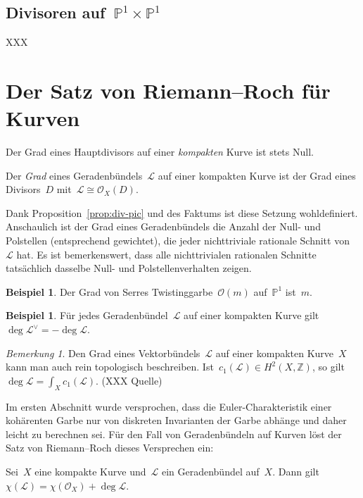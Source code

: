 \documentclass[a4paper,ngerman,12pt]{scrartcl}
\theoremstyle{definition}
\newtheorem{ex}[defn]{Beispiel}
\theoremstyle{plain}
\theoremstyle{remark}
\newtheorem{rem}[defn]{Bemerkung}
\newcommand{\ZZ}{\mathbb{Z}}
\newcommand{\PP}{\mathbb{P}}
\renewcommand{\L}{\mathcal{L}}
\renewcommand{\O}{\mathcal{O}}
\begin{document}
\subsection*{Divisoren auf~$\PP^1 \times \PP^1$}

XXX


\section{Der Satz von Riemann--Roch für Kurven}

\begin{fact}Der Grad eines Hauptdivisors auf einer \emph{kompakten} Kurve ist
stets Null.\end{fact}

\begin{defn}Der \emph{Grad} eines Geradenbündels~$\L$ auf einer kompakten Kurve
ist der Grad eines Divisors~$D$ mit~$\L \cong \O_X(D)$.\end{defn}

Dank Proposition~\ref{prop:div-pic} und des Faktums ist diese Setzung
wohldefiniert. Anschaulich ist der Grad eines Geradenbündels die Anzahl der
Null- und Polstellen (entsprechend gewichtet), die jeder nichttriviale rationale
Schnitt von~$\L$ hat. Es ist bemerkenswert, dass alle nichttrivialen rationalen
Schnitte tatsächlich dasselbe Null- und Polstellenverhalten zeigen.

\begin{ex}Der Grad von Serres Twistinggarbe~$\O(m)$ auf~$\PP^1$
ist~$m$.\end{ex}

\begin{ex}Für jedes Geradenbündel~$\L$ auf einer kompakten Kurve gilt
$\deg\L^\vee = -\deg\L$.\end{ex}

\begin{rem}Den Grad eines Vektorbündels~$\L$ auf einer kompakten Kurve~$X$ kann
man auch rein topologisch beschreiben. Ist~$c_1(\L) \in H^2(X, \ZZ)$, so
gilt~$\deg\L = \int_X c_1(\L)$. (XXX Quelle)\end{rem}

Im ersten Abschnitt wurde versprochen, dass die Euler-Charakteristik einer
kohärenten Garbe nur von diskreten Invarianten der Garbe abhänge und daher
leicht zu berechnen sei. Für den Fall von Geradenbündeln auf Kurven löst der
Satz von Riemann--Roch dieses Versprechen ein:

\begin{thm}
Sei~$X$ eine kompakte Kurve und~$\L$ ein Geradenbündel auf~$X$. Dann gilt
$\chi(\L) = \chi(\O_X) + \deg\L$.
\end{thm}
\end{document}
